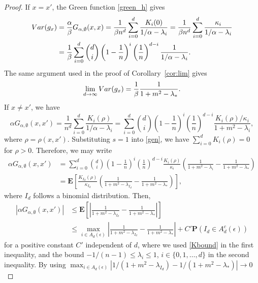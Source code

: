 \documentclass[10pt,a4paper]{amsart}
\begin{document}
\begin{proof}
  If $x=x'$, the Green function \eqref{green_h} gives
  \begin{align*}
    {\rm Var}(g_x)
    &=\frac{\alpha}{\beta}G_{\alpha,\emptyset}(x,x)
    =\frac{1}{\beta n^d}\sum_{i=0}^d\frac{K_i(0)}
    {1/\alpha-\lambda_i}
    =\frac{1}{\beta n^d}\sum_{i=0}^d\frac{\kappa_i}
    {1/\alpha-\lambda_i}\\
    &=\frac{1}{\beta}\sum_{i=0}^d
    {d \choose i}\left(1-\frac{1}{n}\right)^i
    \left(\frac{1}{n}\right)^{d-i}
    \frac{1}{1/\alpha-\lambda_i}.
  \end{align*}
  The same argument used in the proof of
  Corollary~\ref{cor:lim} gives
  \[
  \lim_{d\to\infty}{\rm Var}(g_x)
  =\frac{1}{\beta}\frac{1}{1+m^2-\lambda_*}.
  \]
  If $x\neq x'$, we have
  \begin{equation*}
    \alpha G_{\alpha,\emptyset}(x,x')=\frac{1}{n^d}
    \sum_{i=0}^d \frac{K_i(\rho)}{1/\alpha-\lambda_i}
    =\sum_{i=0}^d
    \binom{d}{i}\left(1-\frac{1}{n}\right)^i
    \left(\frac{1}{n}\right)^{d-i}
    \frac{K_i(\rho)/\kappa_i}{1+m^2-\lambda_i},
  \end{equation*}
  where $\rho=\rho(x,x')$.
  Substituting $s=1$ into \eqref{gen}, we have $\sum_{i=0}^d K_i(\rho)=0$
  for $\rho>0$. Therefore, we may write
  \begin{align*}
    \alpha G_{\alpha,\emptyset}(x,x')
    &=\sum_{i=0}^d
    \binom{d}{i}\left(1-\frac{1}{n}\right)^i
    \left(\frac{1}{n}\right)^{d-i}
    \frac{K_i(\rho)}{\kappa_i}
    \left(\frac{1}{1+m^2-\lambda_i}-\frac{1}{1+m^2-\lambda_*}\right)\\
    &=\mathbf{E}\left[
    \frac{K_{I_d}(\rho)}{\kappa_{I_d}}
    \left(\frac{1}{1+m^2-\lambda_{I_d}}-\frac{1}{1+m^2-\lambda_*}
    \right)\right],
  \end{align*}
  where $I_d$ follows a binomial distribution. Then,
  \begin{align*}
    |\alpha G_{\alpha,\emptyset}(x,x')|&\le
    \mathbf{E}\left[\left|
    \frac{1}{1+m^2-\lambda_{I_d}}-\frac{1}{1+m^2-\lambda_*}
    \right|\right]\\
    &\le
    \max_{i\in A_d(\epsilon)}
    \left|\frac{1}{1+m^2-\lambda_{I_d}}-\frac{1}{1+m^2-\lambda_*}\right|
    +C'\mathbf{P}(I_d\in A_d^c(\epsilon))
  \end{align*}
  for a positive constant $C'$ independent of $d$, where we used
  \eqref{Kbound} in the first inequality, and the bound
  $-1/(n-1)\le \lambda_i \le 1$, $i\in\{0,1,\ldots,d\}$ in
  the second inequality. By using
  $\max_{i\in A_d(\epsilon)}|1/(1+m^2-\lambda_{I_d})-1/(1+m^2-\lambda_*)|\to 0$

\end{proof}
\end{document}
